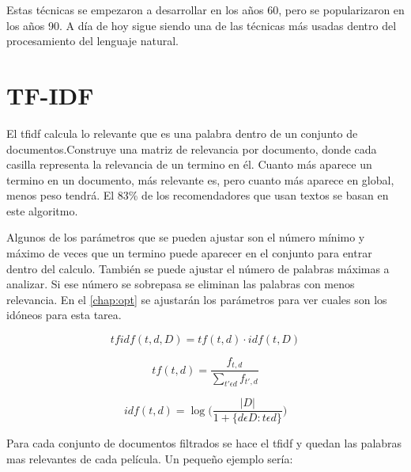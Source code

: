 \documentclass[withindex, glossary]{cam-thesis}
\begin{document}
Estas técnicas se empezaron a desarrollar en los años 60\cite{Borko:1963:ADC:321160.321165}, pero se popularizaron en los años 90\cite{Deerwester90indexingby}. A día de hoy sigue siendo una de las técnicas más usadas dentro del procesamiento del lenguaje natural.

\section{TF-IDF}
El \acrfull{tfidf} calcula lo relevante que es una palabra dentro de un conjunto de documentos.Construye una matriz de relevancia por documento, donde cada casilla representa la relevancia de un termino en él. Cuanto más aparece un termino en un documento, más relevante es, pero cuanto más aparece en global, menos peso tendrá. El 83\% de los recomendadores que usan textos se basan en este algoritmo\cite{Beel2016}.

Algunos de los parámetros que se pueden ajustar son el número mínimo y máximo de veces que un termino puede aparecer en el conjunto para entrar dentro del calculo. También se puede ajustar el número de palabras máximas a analizar. Si ese número se sobrepasa se eliminan las palabras con menos relevancia. En el \autoref{chap:opt} se ajustarán los parámetros para ver cuales son los idóneos para esta tarea.

\begin{equation} \label{eq:tf-idf}
    tfidf(t, d, D) = tf(t, d) \cdot idf(t, D)
\end{equation}

\begin{equation} \label{eq:tf}
    tf(t, d) = \dfrac{f_{t, d}}{\sum_{t' \epsilon d}^{}f_{t', d}}
\end{equation}

\begin{equation} \label{eq:idf}
    idf(t, d) = \log\biggl(\dfrac{|D|}{1 + \{d \epsilon D : t \epsilon d \}}\biggr)
\end{equation}

Para cada conjunto de documentos filtrados se hace el \acrshort{tfidf} y quedan las palabras mas relevantes de cada película. Un pequeño ejemplo sería:
\end{document}
